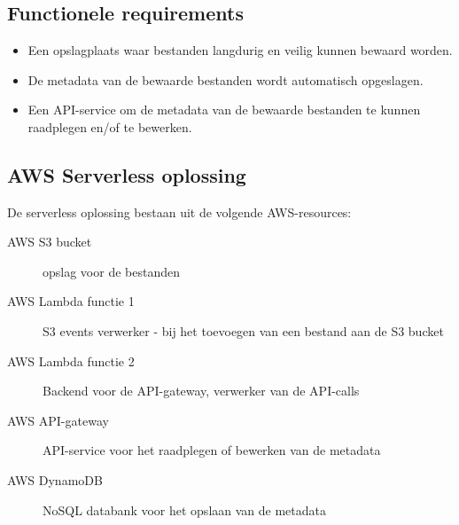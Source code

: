 
\chapter{}
\label{ch:business-case}

\section{Functionele requirements}
\label{sec:functionele-requirements}

\begin{itemize}
    \item Een opslagplaats waar bestanden langdurig en veilig kunnen bewaard worden.
    \item De metadata van de bewaarde bestanden wordt automatisch opgeslagen.
    \item Een API-service om de metadata van de bewaarde bestanden te kunnen raadplegen en/of te bewerken.
\end{itemize}

\section{AWS Serverless oplossing}
\label{sec:serverless-oplossing}

De serverless oplossing bestaan uit de volgende AWS-resources:

\begin{description}
    \item[AWS S3 bucket] opslag voor de bestanden
    \item[AWS Lambda functie 1] S3 events verwerker - bij het toevoegen van een bestand aan de S3 bucket
    \item[AWS Lambda functie 2] Backend voor de API-gateway, verwerker van de API-calls
    \item[AWS API-gateway] API-service voor het raadplegen of bewerken van de metadata
    \item[AWS DynamoDB] NoSQL databank voor het opslaan van de metadata
\end{description}

